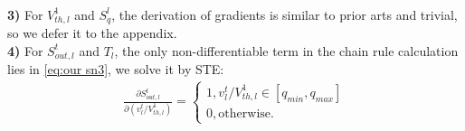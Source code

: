 \\\textbf{3)} For $V^1_{th,l}$ and $S^l_q$, the derivation of gradients is similar to prior arts \cite{esser2020learned} and trivial, so we defer it to the appendix.
\\\textbf{4)} For $S^t_{out,l}$ and $T_l$, the only non-differentiable term in the chain rule calculation lies in  \cref{eq:our sn3}, we solve it by STE:
\begin{align}
    \frac{\partial S^t_{out,l}}{\partial (v^t_l/V_{th,l}^1 )} = 
\begin{cases}
1, v^t_l/V_{th,l}^1 \in [q_{min}, q_{max}]\\
0,\text{otherwise}.
\end{cases}
\end{align}
